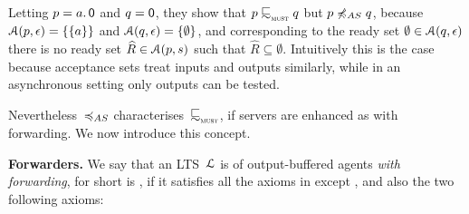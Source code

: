 %
Letting $p = a.\mathop{\textsf{0}}$ and $q = \mathop{\textsf{0}}$, they show that
$\serverA \testleqS \serverB $ but $ \serverA \not \asleq \serverB$,
because $\mathcal{A}( p , \epsilon ) =\{ \{ a \} \}$ and
$\mathcal{A}( q , \epsilon ) =\{ \emptyset \}$, and corresponding to
the ready set $\emptyset \in \mathcal{A}( q , \epsilon )$ there is no
ready set $\widehat{R} \in \mathcal{A}( p , s)$ such that
$\widehat{R} \subseteq \emptyset$. %
%
%
Intuitively this is the case because acceptance sets treat inputs and
outputs similarly, while in an asynchronous setting only outputs can
be tested.

Nevertheless~$\asleq$ characterises~$\testleqS$, if servers
are enhanced as with forwarding. We now introduce this concept.





{\bfseries Forwarders.}
We say that an LTS~$\mathcal{L}$ is of output-buffered agents {\em with forwarding},
for short is \obaFW, if it satisfies all the axioms in
 except \outputfeedback, and also the two following axioms:%

